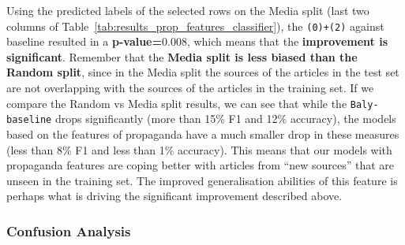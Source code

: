 
Using the predicted labels of the selected rows on the Media split (last two columns of Table~\ref{tab:results_prop_features_classifier}), the \texttt{(0)+(2)} against baseline resulted in a \textbf{p-value=$0.008$}, which means that the \textbf{improvement is significant}.
Remember that the \textbf{Media split is less biased than the Random split}, since in the Media split the sources of the articles in the test set are not overlapping with the sources of the articles in the training set. If we compare the Random vs Media split results, we can see that while the \texttt{Baly-baseline} drops significantly (more than 15\% F1 and 12\% accuracy), the models based on the features of propaganda have a much smaller drop in these measures (less than 8\% F1 and less than 1\% accuracy).
This means that our models with propaganda features are coping better with articles from ``new sources'' that are unseen in the training set.
The improved generalisation abilities of this feature is perhaps what is driving the significant improvement described above. %

\subsubsection{Confusion Analysis}

